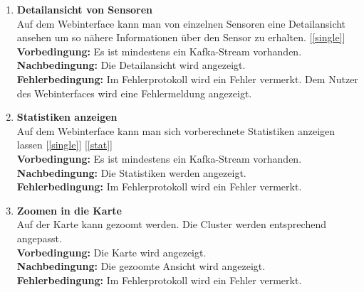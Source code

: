 \begin{enumerate}[label=\textbf{PF\arabic{enumi}0}]
	\item \textbf{Detailansicht von Sensoren}\\
		Auf dem Webinterface kann man von einzelnen Sensoren eine Detailansicht ansehen um so nähere Informationen über den Sensor zu erhalten. [\ref{single}]\\
		\textbf{Vorbedingung:} Es ist mindestens ein Kafka-Stream vorhanden.\\
		\textbf{Nachbedingung:} Die Detailansicht wird angezeigt.\\
		\textbf{Fehlerbedingung:} Im Fehlerprotokoll wird ein Fehler vermerkt. Dem Nutzer des Webinterfaces wird eine Fehlermeldung angezeigt.
		
	\item \textbf{Statistiken anzeigen}\\
		Auf dem Webinterface kann man sich vorberechnete Statistiken anzeigen lassen [\ref{single}] [\ref{stat}]\\
		\textbf{Vorbedingung:} Es ist mindestens ein Kafka-Stream vorhanden.\\
		\textbf{Nachbedingung:} Die Statistiken werden angezeigt.\\
		\textbf{Fehlerbedingung:} Im Fehlerprotokoll wird ein Fehler vermerkt.
				
	\item \textbf{Zoomen in die Karte}\\
		Auf der Karte kann gezoomt werden. Die Cluster werden entsprechend angepasst.\\
		\textbf{Vorbedingung:} Die Karte wird angezeigt.\\
		\textbf{Nachbedingung:} Die gezoomte Ansicht wird angezeigt.\\
		\textbf{Fehlerbedingung:} Im Fehlerprotokoll wird ein Fehler vermerkt.
		
\end{enumerate}

